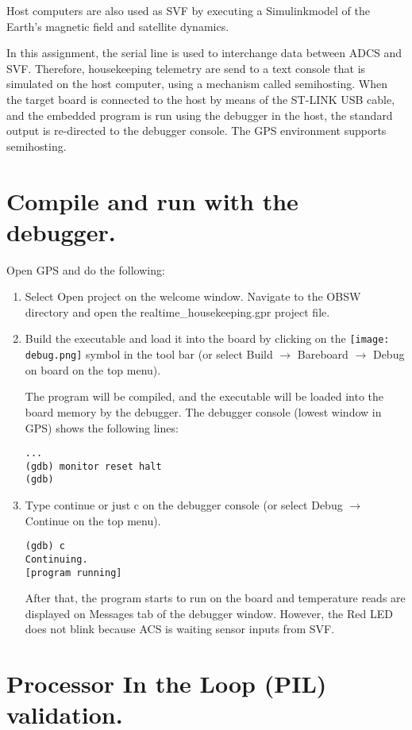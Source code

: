 Host computers are also used as SVF by executing a Simulink\texttrademark model of the Earth's magnetic field and satellite dynamics.

In this assignment, the serial line is used to interchange data between ADCS and SVF. Therefore, housekeeping telemetry are send to a text console that is simulated on the host computer, using a mechanism called semihosting. When the target board is connected to the host by means of the ST-LINK USB cable, and the embedded program is run using the debugger in the host, the standard output is re-directed to the debugger console. The GPS environment supports semihosting.

\section{Compile and run with the debugger.}

Open GPS and do the following:
\begin{enumerate}
\item Select Open project on the welcome window. Navigate to the OBSW directory and open the realtime\_housekeeping.gpr project file.
\item Build the executable and load it into the board by clicking on the \hbox{\texttt{[image: debug.png]}} symbol in the tool bar (or select Build $\rightarrow$ Bareboard $\rightarrow$ Debug on board on the top menu).

The program will be compiled, and the executable will be loaded into the board memory by the debugger. The debugger console (lowest window in GPS) shows the following lines:
\begin{verbatim}
...
(gdb) monitor reset halt
(gdb)
\end{verbatim}

\item Type continue or just c on the debugger console (or select Debug $\rightarrow$ Continue on the top menu).
\begin{verbatim}
(gdb) c
Continuing.
[program running]
\end{verbatim}

After that, the program starts to run on the board and temperature reads are displayed on Messages tab of the debugger window. However, the Red LED does not blink because ACS is waiting sensor inputs from SVF.
\end{enumerate}

\section{Processor In the Loop (PIL) validation.}

